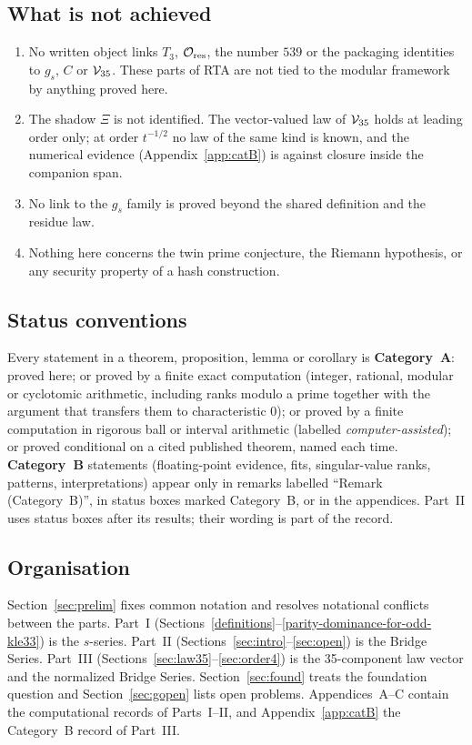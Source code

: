 \subsection{What is not achieved}
\begin{enumerate}[label=(\arabic*),leftmargin=2em]
\item No written object links $T_3$, $\mathcal O_{\rm res}$, the number $539$ or the packaging identities to $g_s$, $C$ or $\mathcal V_{35}$. These parts of
RTA are not tied to the modular framework by anything proved here.
\item The shadow $\Xi$ is not identified. The vector-valued law of $\mathcal V_{35}$ holds at leading order only; at order $t^{-1/2}$ no law of the same kind
is known, and the numerical evidence (Appendix~\ref{app:catB}) is against closure inside the companion span.
\item No link to the $g_s$ family is proved beyond the shared definition and the residue law.
\item Nothing here concerns the twin prime conjecture, the Riemann hypothesis, or any security property of a hash construction.
\end{enumerate}

\subsection{Status conventions}
Every statement in a theorem, proposition, lemma or corollary is \textbf{Category~A}: proved here; or proved by a finite exact computation
(integer, rational, modular or cyclotomic arithmetic, including ranks modulo a prime together with the argument that transfers them to
characteristic $0$); or proved by a finite computation in rigorous ball or interval arithmetic (labelled \emph{computer-assisted}); or proved
conditional on a cited published theorem, named each time. \textbf{Category~B} statements (floating-point evidence, fits, singular-value ranks,
patterns, interpretations) appear only in remarks labelled ``Remark (Category~B)'', in status boxes marked Category~B, or in the appendices.
Part~II uses status boxes after its results; their wording is part of the record.

\subsection{Organisation}
Section~\ref{sec:prelim} fixes common notation and resolves notational conflicts between the parts. Part~I (Sections~\ref{definitions}--\ref{parity-dominance-for-odd-kle33})
is the $s$-series. Part~II (Sections~\ref{sec:intro}--\ref{sec:open}) is the Bridge Series. Part~III (Sections~\ref{sec:law35}--\ref{sec:order4}) is
the 35-component law vector and the normalized Bridge Series. Section~\ref{sec:found} treats the foundation question and Section~\ref{sec:gopen}
lists open problems. Appendices~A--C contain the computational records of Parts~I--II, and Appendix~\ref{app:catB} the Category~B record of Part~III.


